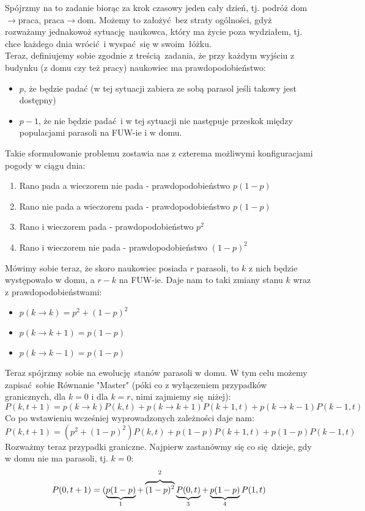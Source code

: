 \documentclass[12pt,a4paper]{article}
\begin{document}
Spójrzmy na to zadanie biorąc za krok czasowy jeden cały dzień, tj. podróż dom$\to$praca, praca$\to$dom. Możemy to założyć bez straty ogólności, gdyż rozważamy jednakowoż sytuację naukowca, który ma życie poza wydziałem, tj. chce każdego dnia wrócić i wyspać się w swoim łóżku.\\
Teraz, definiujemy sobie zgodnie z treścią zadania, że przy każdym wyjściu z budynku (z domu czy też pracy) naukowiec ma prawdopodobieństwo:
\begin{itemize}
    \item $p$, że będzie padać (w tej sytuacji zabiera ze sobą parasol jeśli takowy jest dostępny)
    \item $p-1$, że nie będzie padać i w tej sytuacji nie następuje przeskok między populacjami parasoli na FUW-ie i w domu.
\end{itemize}
Takie sformułowanie problemu zostawia nas z czterema możliwymi konfiguracjami pogody w ciągu dnia:
\begin{enumerate}
    \item Rano pada a wieczorem nie pada - prawdopodobieństwo $p(1-p)$
    \item Rano nie pada a wieczorem pada - prawdopodobieństwo $p(1-p)$
    \item Rano i wieczorem pada - prawdopodobieństwo $p^2$
    \item Rano i wieczorem nie pada - prawdopodobieństwo $(1-p)^2$
\end{enumerate}
Mówimy sobie teraz, że skoro naukowiec posiada $r$ parasoli, to $k$ z nich będzie występowało w domu, a $r-k$ na FUW-ie. Daje nam to taki zmiany stanu $k$ wraz z prawdopodobieństwami:
\begin{itemize}
    \item $p(k\to k) = p^2 + (1-p)^2$
    \item $p(k\to k+1) = p(1-p)$
    \item $p(k \to k-1) = p(1-p)$
\end{itemize}
Teraz spójrzmy sobie na ewolucję stanów parasoli w domu. W tym celu możemy zapisać sobie Równanie "Master" (póki co z wyłączeniem przypadków granicznych, dla $k = 0$ i dla $k = r$, nimi zajmiemy się niżej):
\[
    P(k, t+1) = p(k \to k) P(k, t) + p(k \to k+1) P(k+1, t) + p(k \to k-1) P(k-1, t)
\]
Co po wstawieniu wcześniej wyprowadzonych zależności daje nam:
\[
    P(k, t+1) = (p^2 + (1-p)^2) P(k, t) + p(1-p) P(k+1, t) + p(1-p) P(k-1, t)
\]
Rozważmy teraz przypadki graniczne. Najpierw zastanówmy się co się dzieje, gdy w domu nie ma parasoli, tj. $k=0$:
\[
    P(0, t+1) = (\underbrace{p(1-p)}_{\footnotemark} + \overbrace{(1-p)^2}^{\footnotemark} \underbrace{P(0, t)}_{\footnotemark} + \underbrace{p(1-p)}_{\footnotemark} P(1, t)
\]
\end{document}
